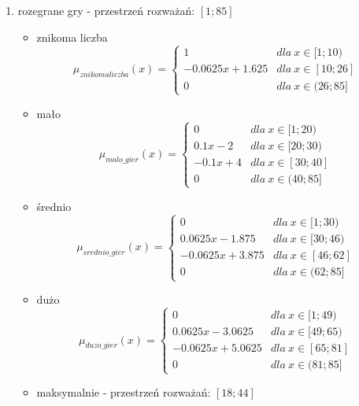 \documentclass{classrep}
\begin{document}
\begin{enumerate}
    \item rozegrane gry - przestrzeń rozważań: $[1;85]$
     \begin{itemize}
        \item znikoma liczba
        \begin{equation}
            \mu_{znikomaliczba}(x) = \left\{\begin{matrix} 1 & dla \: x\in[1;10) \\ -0.0625x + 1.625 & dla \: x\in [10; 26] \\ 0 & dla \: x\in (26;85] \end{matrix}\right.
        \end{equation}
        \item mało
        \begin{equation}
            \mu_{malo\_gier}(x) = \left\{\begin{matrix}0 & dla \: x\in [1;20) \\ 0.1x - 2 & dla \: x\in[20;30) \\ -0.1x + 4 & dla \: x\in [30; 40] \\ 0 & dla \: x\in (40;85] \end{matrix}\right.
        \end{equation}
        \item średnio
        \begin{equation}
            \mu_{srednio\_gier}(x) = \left\{\begin{matrix} 0 & dla \: x\in [1;30) \\ 0.0625x - 1.875 & dla \: x\in[30;46) \\ -0.0625x + 3.875 & dla \: x\in [46; 62]\\ 0 & dla \: x\in (62;85] \end{matrix}\right.
        \end{equation}
        \item dużo
        \begin{equation}
            \mu_{duzo\_gier}(x) = \left\{\begin{matrix} 0 & dla \: x\in [1;49) \\ 0.0625x - 3.0625 & dla \: x\in[49;65) \\ -0.0625x + 5.0625 & dla \: x\in [65; 81]\\ 0 & dla \: x\in (81;85] \end{matrix}\right.
        \end{equation}
        \item maksymalnie - przestrzeń rozważań: $[18;44]$
        \begin{equation}

\end{equation}
\end{itemize}
\end{enumerate}
\end{document}
